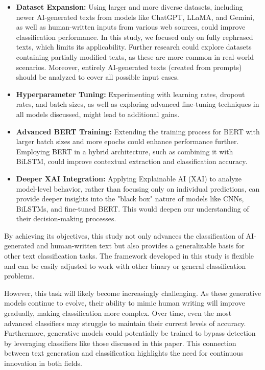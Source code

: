 \begin{itemize}
    \item \textbf{Dataset Expansion:} Using larger and more diverse datasets, including newer AI-generated texts from models like ChatGPT, LLaMA, and Gemini, as well as human-written inputs from various web sources, could improve classification performance. In this study, we focused only on fully rephrased texts, which limits its applicability. Further research could explore datasets containing partially modified texts, as these are more common in real-world scenarios. Moreover, entirely AI-generated texts (created from prompts) should be analyzed to cover all possible input cases.
    \item \textbf{Hyperparameter Tuning:} Experimenting with learning rates, dropout rates, and batch sizes, as well as exploring advanced fine-tuning techniques in all models discussed, might lead to additional gains.
    \item \textbf{Advanced BERT Training:} Extending the training process for BERT with larger batch sizes and more epochs could enhance performance further. Employing BERT in a hybrid architecture, such as combining it with BiLSTM, could improve contextual extraction and classification accuracy.
    \item \textbf{Deeper XAI Integration:}  Applying Explainable AI (XAI) to analyze model-level behavior, rather than focusing only on individual predictions, can provide deeper insights into the "black box" nature of models like CNNs, BiLSTMs, and fine-tuned BERT. This would deepen our understanding of their decision-making processes. 
\end{itemize}

\vspace{3mm}



By achieving its objectives, this study not only advances the classification of AI-generated and human-written text but also provides a generalizable basis for other text classification tasks. The framework developed in this study is flexible and can be easily adjusted to work with other binary or general classification problems.

\vspace{3mm}

However, this task will likely become increasingly challenging. As these generative models continue to evolve, their ability to mimic human writing will improve gradually, making classification more complex. Over time, even the most advanced classifiers may struggle to maintain their current levels of accuracy. Furthermore, generative models could potentially be trained to bypass detection by leveraging classifiers like those discussed in this paper. This connection between text generation and classification highlights the need for continuous innovation in both fields.
